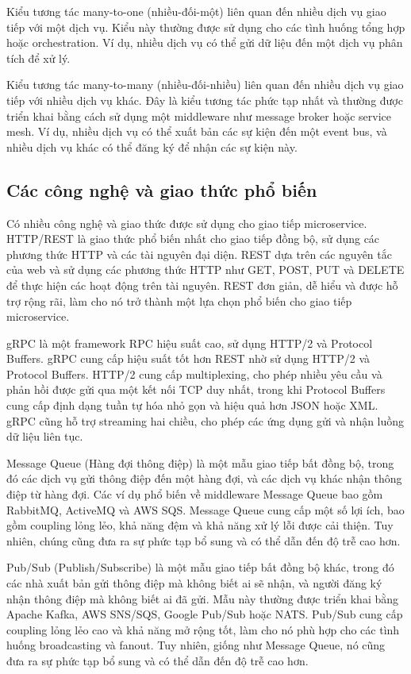 Kiểu tương tác many-to-one (nhiều-đối-một) liên quan đến nhiều dịch vụ giao
tiếp với một dịch vụ. Kiểu này thường được sử dụng cho các tình huống tổng hợp
hoặc orchestration. Ví dụ, nhiều dịch vụ có thể gửi dữ liệu đến một dịch vụ
phân tích để xử lý.

Kiểu tương tác many-to-many (nhiều-đối-nhiều) liên quan đến nhiều dịch vụ giao
tiếp với nhiều dịch vụ khác. Đây là kiểu tương tác phức tạp nhất và thường được
triển khai bằng cách sử dụng một middleware như message broker hoặc service
mesh. Ví dụ, nhiều dịch vụ có thể xuất bản các sự kiện đến một event bus, và
nhiều dịch vụ khác có thể đăng ký để nhận các sự kiện này.

\subsection{Các công nghệ và giao thức phổ biến}
Có nhiều công nghệ và giao thức được sử dụng cho giao tiếp microservice.
HTTP/REST là giao thức phổ biến nhất cho giao tiếp đồng bộ, sử dụng các phương
thức HTTP và các tài nguyên đại diện. REST dựa trên các nguyên tắc của web và
sử dụng các phương thức HTTP như GET, POST, PUT và DELETE để thực hiện các hoạt
động trên tài nguyên. REST đơn giản, dễ hiểu và được hỗ trợ rộng rãi, làm cho
nó trở thành một lựa chọn phổ biến cho giao tiếp microservice.

gRPC là một framework RPC hiệu suất cao, sử dụng HTTP/2 và Protocol Buffers.
gRPC cung cấp hiệu suất tốt hơn REST nhờ sử dụng HTTP/2 và Protocol Buffers.
HTTP/2 cung cấp multiplexing, cho phép nhiều yêu cầu và phản hồi được gửi qua
một kết nối TCP duy nhất, trong khi Protocol Buffers cung cấp định dạng tuần tự
hóa nhỏ gọn và hiệu quả hơn JSON hoặc XML. gRPC cũng hỗ trợ streaming hai
chiều, cho phép các ứng dụng gửi và nhận luồng dữ liệu liên tục.

Message Queue (Hàng đợi thông điệp) là một mẫu giao tiếp bất đồng bộ, trong đó
các dịch vụ gửi thông điệp đến một hàng đợi, và các dịch vụ khác nhận thông
điệp từ hàng đợi. Các ví dụ phổ biến về middleware Message Queue bao gồm
RabbitMQ, ActiveMQ và AWS SQS. Message Queue cung cấp một số lợi ích, bao gồm
coupling lỏng lẻo, khả năng đệm và khả năng xử lý lỗi được cải thiện. Tuy
nhiên, chúng cũng đưa ra sự phức tạp bổ sung và có thể dẫn đến độ trễ cao hơn.

Pub/Sub (Publish/Subscribe) là một mẫu giao tiếp bất đồng bộ khác, trong đó các
nhà xuất bản gửi thông điệp mà không biết ai sẽ nhận, và người đăng ký nhận
thông điệp mà không biết ai đã gửi. Mẫu này thường được triển khai bằng Apache
Kafka, AWS SNS/SQS, Google Pub/Sub hoặc NATS. Pub/Sub cung cấp coupling lỏng
lẻo cao và khả năng mở rộng tốt, làm cho nó phù hợp cho các tình huống
broadcasting và fanout. Tuy nhiên, giống như Message Queue, nó cũng đưa ra sự
phức tạp bổ sung và có thể dẫn đến độ trễ cao hơn.

